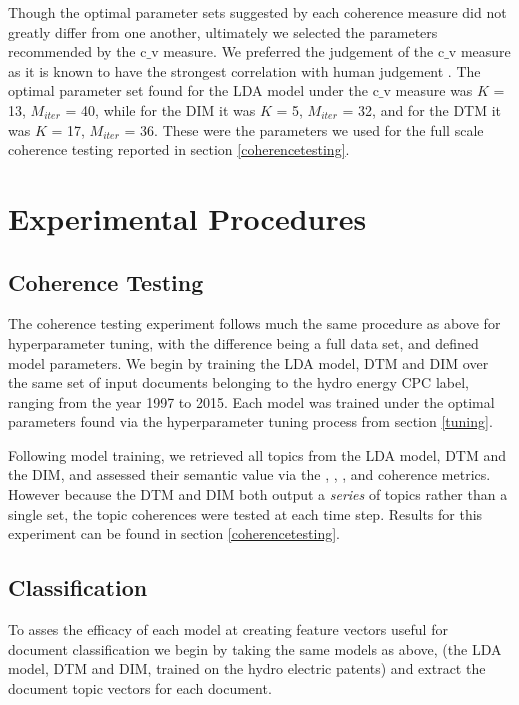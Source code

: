 Though the optimal parameter sets suggested by each coherence measure did not greatly differ from one another, ultimately we selected the parameters recommended by the c$\_$v measure. We preferred the judgement of the c$\_$v measure as it is known to have the strongest correlation with human judgement \parencite{Roder:2015:EST:2684822.2685324}. The optimal parameter set found for the LDA model under the c$\_$v measure was $K$ = 13, $M_{iter}$ = 40, while for the DIM it was $K$ = 5, $M_{iter}$ = 32, and for the DTM it was $K$ = 17, $M_{iter}$ = 36. These were the parameters we used for the full scale coherence testing reported in section \ref{coherencetesting}.



\section{Experimental Procedures}

\subsection{Coherence Testing}
The coherence testing experiment follows much the same procedure as above for hyperparameter tuning, with the difference being a full data set, and defined model parameters. We begin by training the LDA model, DTM and DIM over the same set of input documents belonging to the  hydro energy CPC label, ranging from the year 1997 to 2015. Each model was trained under the optimal parameters found via the hyperparameter tuning process from section \ref{tuning}. 

Following model training, we retrieved all topics from the LDA model, DTM and the DIM, and assessed their semantic value via the , , , and  coherence metrics. However because the DTM and DIM both output a \emph{series} of topics rather than a single set, the topic coherences were tested at each time step. Results for this experiment can be found in section \ref{coherencetesting}.

\subsection{Classification}
To asses the efficacy of each model at creating feature vectors useful for document classification we begin by taking the same models as above, (the LDA model, DTM and DIM, trained on the hydro electric patents) and extract the document topic vectors for each document.

